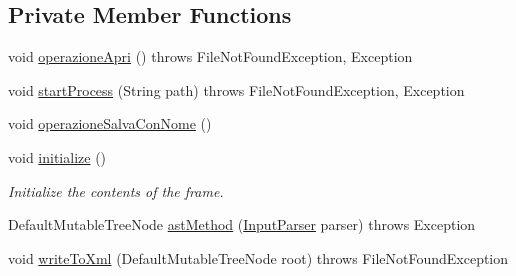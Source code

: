 \subsection*{Private Member Functions}
\begin{DoxyCompactItemize}
\item 
void \hyperlink{class_home_gui_a8a91bfb188035012962b468a651f73a5}{operazione\-Apri} ()  throws File\-Not\-Found\-Exception, Exception 
\item 
void \hyperlink{class_home_gui_a52f0602a97cd1ef63063bbbbda036d26}{start\-Process} (String path)  throws File\-Not\-Found\-Exception, Exception 
\item 
void \hyperlink{class_home_gui_ad557119a3d770022d77a7a396c7834bd}{operazione\-Salva\-Con\-Nome} ()
\item 
void \hyperlink{class_home_gui_a5e935834d62fe14dfda2c9884f1f7010}{initialize} ()
\begin{DoxyCompactList}\small\item\em Initialize the contents of the frame. \end{DoxyCompactList}\item 
Default\-Mutable\-Tree\-Node \hyperlink{class_home_gui_a98af3aa80619748a678edae77b231bef}{ast\-Method} (\hyperlink{classinput_parser_1_1_input_parser}{Input\-Parser} parser)  throws Exception 
\item 
void \hyperlink{class_home_gui_a0428d3c56abfafc769684835c1581f38}{write\-To\-Xml} (Default\-Mutable\-Tree\-Node root)  throws File\-Not\-Found\-Exception 
\end{DoxyCompactItemize}
